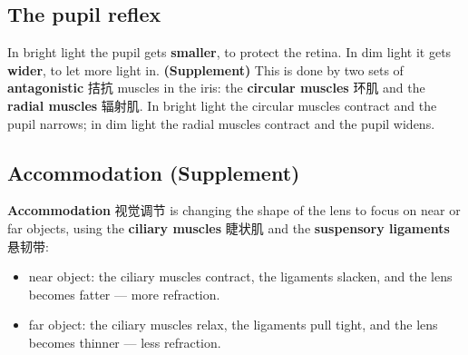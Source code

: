 \documentclass[11pt]{article}
\begin{document}
\begin{center}
\end{center}

\subsection*{The pupil reflex}

In bright light the pupil gets \textbf{smaller}, to protect the retina. In dim light it gets \textbf{wider}, to let more light in. \textbf{(Supplement)} This is done by two sets of \textbf{antagonistic} 拮抗 muscles in the iris: the \textbf{circular muscles} 环肌 and the \textbf{radial muscles} 辐射肌. In bright light the circular muscles contract and the pupil narrows; in dim light the radial muscles contract and the pupil widens.

\subsection*{Accommodation (Supplement)}

\textbf{Accommodation} 视觉调节 is changing the shape of the lens to focus on near or far objects, using the \textbf{ciliary muscles} 睫状肌 and the \textbf{suspensory ligaments} 悬韧带:

\begin{itemize}
\item near object: the ciliary muscles contract, the ligaments slacken, and the lens becomes fatter — more refraction.

\item far object: the ciliary muscles relax, the ligaments pull tight, and the lens becomes thinner — less refraction.

\end{itemize}
\end{document}
